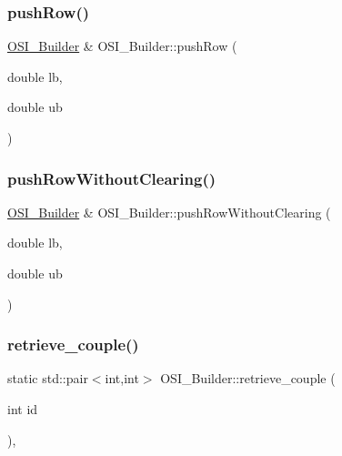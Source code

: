 \subsubsection{\texorpdfstring{push\+Row()}{pushRow()}}
{\footnotesize\ttfamily \hyperlink{class_o_s_i___builder}{O\+S\+I\+\_\+\+Builder} \& O\+S\+I\+\_\+\+Builder\+::push\+Row (\begin{DoxyParamCaption}\item[{double}]{lb,  }\item[{double}]{ub }\end{DoxyParamCaption})}

\mbox{\label{class_o_s_i___builder_a123c8cb445a247c6a8cb3e8271553e77}} 
\subsubsection{\texorpdfstring{push\+Row\+Without\+Clearing()}{pushRowWithoutClearing()}}
{\footnotesize\ttfamily \hyperlink{class_o_s_i___builder}{O\+S\+I\+\_\+\+Builder} \& O\+S\+I\+\_\+\+Builder\+::push\+Row\+Without\+Clearing (\begin{DoxyParamCaption}\item[{double}]{lb,  }\item[{double}]{ub }\end{DoxyParamCaption})}

\mbox{\label{class_o_s_i___builder_a47117c9ae73021710fd1ed695bb5d9e5}} 
\subsubsection{\texorpdfstring{retrieve\+\_\+couple()}{retrieve\_couple()}}
{\footnotesize\ttfamily static std\+::pair$<$int,int$>$ O\+S\+I\+\_\+\+Builder\+::retrieve\+\_\+couple (\begin{DoxyParamCaption}\item[{int}]{id }\end{DoxyParamCaption})\hspace{0.3cm}{\ttfamily [inline]}, {\ttfamily [static]}}

